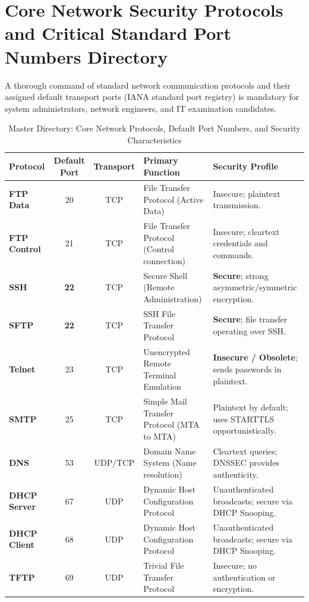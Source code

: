 \newpage
\section{Core Network Security Protocols and Critical Standard Port Numbers Directory}

A thorough command of standard network communication protocols and their assigned default transport ports (IANA standard port registry) is mandatory for system administrators, network engineers, and IT examination candidates.

\begin{table}[htbp]
\centering
\caption{Master Directory: Core Network Protocols, Default Port Numbers, and Security Characteristics}
\label{tab:network_ports_master}
\begin{tabularx}{\textwidth}{l c c p{4.2cm} X}
\toprule
\textbf{Protocol} & \textbf{Default Port} & \textbf{Transport} & \textbf{Primary Function} & \textbf{Security Profile} \\
\midrule
\textbf{FTP Data} & 20 & TCP & File Transfer Protocol (Active Data) & Insecure; plaintext transmission. \\
\textbf{FTP Control} & 21 & TCP & File Transfer Protocol (Control connection) & Insecure; cleartext credentials and commands. \\
\textbf{SSH} & \textbf{22} & TCP & Secure Shell (Remote Administration) & \textbf{Secure}; strong asymmetric/symmetric encryption. \\
\textbf{SFTP} & \textbf{22} & TCP & SSH File Transfer Protocol & \textbf{Secure}; file transfer operating over SSH. \\
\textbf{Telnet} & 23 & TCP & Unencrypted Remote Terminal Emulation & \textbf{Insecure / Obsolete}; sends passwords in plaintext. \\
\textbf{SMTP} & 25 & TCP & Simple Mail Transfer Protocol (MTA to MTA) & Plaintext by default; uses STARTTLS opportunistically. \\
\textbf{DNS} & 53 & UDP/TCP & Domain Name System (Name resolution) & Cleartext queries; DNSSEC provides authenticity. \\
\textbf{DHCP Server} & 67 & UDP & Dynamic Host Configuration Protocol & Unauthenticated broadcasts; secure via DHCP Snooping. \\
\textbf{DHCP Client} & 68 & UDP & Dynamic Host Configuration Protocol & Unauthenticated broadcasts; secure via DHCP Snooping. \\
\textbf{TFTP} & 69 & UDP & Trivial File Transfer Protocol & Insecure; no authentication or encryption. \\

\end{tabularx}
\end{table}
